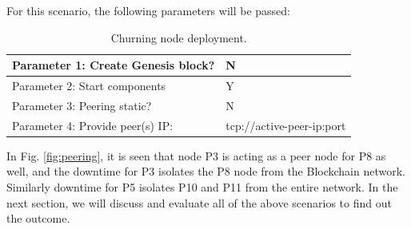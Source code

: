 For this scenario, the following parameters will be passed:
\begin{table}[H]
\centering
\label{tab:node_n_install2}
\begin{tabular}{|l|l|}
\hline
Parameter 1: Create Genesis block? & N                          \\ \hline
Parameter 2: Start components      & Y                          \\ \hline
Parameter 3: Peering static?       & N                          \\ \hline
Parameter 4: Provide peer(s) IP:   & tcp://active-peer-ip:port  \\ \hline
\end{tabular}
\caption{Churning node deployment.}
\vspace{-4mm}
\end{table}

In Fig. \ref{fig:peering}, it is seen that node P3 is acting as a peer node for P8 as well, and the downtime for P3 isolates the P8 node from the Blockchain network. Similarly downtime for P5 isolates P10 and P11 from the entire network. In the next section, we will discuss and evaluate all of the above scenarios to find out the outcome. 
